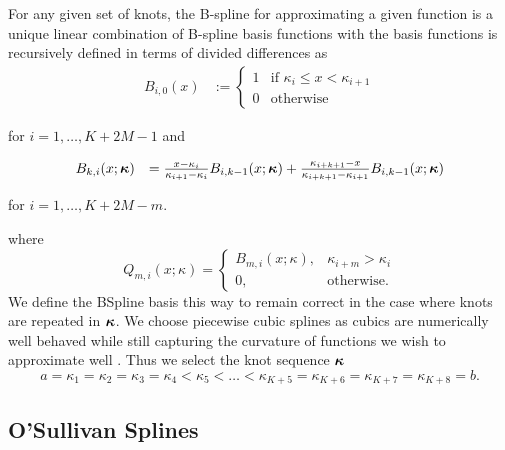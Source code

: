 For any given set of knots, the B-spline for approximating a given function is a unique linear combination of
B-spline basis functions with the basis functions is recursively defined in terms of divided differences as
$$
\begin{array}{rl}
	B_{i, 0}(x) & := \begin{cases}                                                                                                        
	1           & \text{if } \kappa_i \leq x < \kappa_{i+1}                                                                                         \\
	0           & \text{otherwise}                                                                                                        
	\end{cases}
\end{array}
$$

\noindent for $i = 1, \ldots, K + 2M -1$ and

$$
\begin{array}{rl}
	B_{k, i}(x; {\boldsymbol \kappa}) &= \frac{x - \kappa_i}{\kappa_{i + 1} - \kappa_i} B_{i, k-1} (x; {\boldsymbol \kappa}) + 
										\frac{\kappa_{i + k + 1} - x}{\kappa_{i + k + 1} - \kappa_{i + 1}} B_{i, k-1} (x; {\boldsymbol \kappa})
\end{array}
$$

\noindent for $i = 1, \ldots, K + 2 M - m$.

\noindent where
$$
Q_{m, i}(x; \kappa) =
\begin{cases}
B_{m, i}(x; \kappa),& \kappa_{i + m} > \kappa_i \\
0, & \text{otherwise}.
\end{cases}
$$
We define the BSpline basis this way to remain correct in the case where knots are repeated in ${\boldsymbol \kappa}$. We
choose piecewise cubic splines as cubics are numerically well behaved while still capturing the curvature of
functions we wish to approximate well \citep{Press:2007:NRE:1403886}. Thus we select the knot sequence
${\boldsymbol \kappa}$
$$
a = \kappa_1 = \kappa_2 = \kappa_3 = \kappa_4 < \kappa_5 < \ldots < \kappa_{K+5} = \kappa_{K+6} = \kappa_{K+7} = \kappa_{K+8} = b.
$$

\subsection{O'Sullivan Splines}

